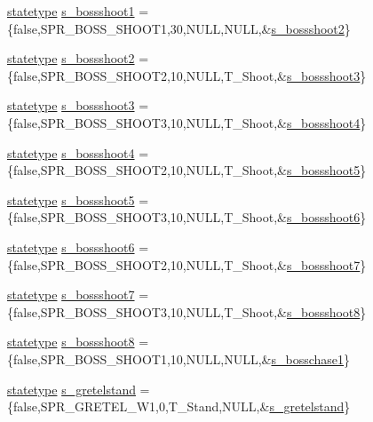 \begin{DoxyCompactItemize}
\hyperlink{structstatestruct}{statetype} \hyperlink{WL__ACT2_8C_a70bba3f03ab51f1e1837358a62d0dd4d}{s\_\-bossshoot1} = \{false,SPR\_\-BOSS\_\-SHOOT1,30,NULL,NULL,\&\hyperlink{WL__ACT2_8C_aaa374c93372be8abb5ed60ea25234fab}{s\_\-bossshoot2}\}
\item 
\hyperlink{structstatestruct}{statetype} \hyperlink{WL__ACT2_8C_aaa374c93372be8abb5ed60ea25234fab}{s\_\-bossshoot2} = \{false,SPR\_\-BOSS\_\-SHOOT2,10,NULL,T\_\-Shoot,\&\hyperlink{WL__ACT2_8C_a24c6ef26a80f794833d9a763fef69be2}{s\_\-bossshoot3}\}
\item 
\hyperlink{structstatestruct}{statetype} \hyperlink{WL__ACT2_8C_a24c6ef26a80f794833d9a763fef69be2}{s\_\-bossshoot3} = \{false,SPR\_\-BOSS\_\-SHOOT3,10,NULL,T\_\-Shoot,\&\hyperlink{WL__ACT2_8C_a78df2716e7b9215264f283b578d5b884}{s\_\-bossshoot4}\}
\item 
\hyperlink{structstatestruct}{statetype} \hyperlink{WL__ACT2_8C_a78df2716e7b9215264f283b578d5b884}{s\_\-bossshoot4} = \{false,SPR\_\-BOSS\_\-SHOOT2,10,NULL,T\_\-Shoot,\&\hyperlink{WL__ACT2_8C_a4b2ddab891860569bbe1199ac3d82659}{s\_\-bossshoot5}\}
\item 
\hyperlink{structstatestruct}{statetype} \hyperlink{WL__ACT2_8C_a4b2ddab891860569bbe1199ac3d82659}{s\_\-bossshoot5} = \{false,SPR\_\-BOSS\_\-SHOOT3,10,NULL,T\_\-Shoot,\&\hyperlink{WL__ACT2_8C_abb4697fcd64af4469f1f3487fcb9aca6}{s\_\-bossshoot6}\}
\item 
\hyperlink{structstatestruct}{statetype} \hyperlink{WL__ACT2_8C_abb4697fcd64af4469f1f3487fcb9aca6}{s\_\-bossshoot6} = \{false,SPR\_\-BOSS\_\-SHOOT2,10,NULL,T\_\-Shoot,\&\hyperlink{WL__ACT2_8C_acd0e8c96f8356c2f331ff30a50aaa9e0}{s\_\-bossshoot7}\}
\item 
\hyperlink{structstatestruct}{statetype} \hyperlink{WL__ACT2_8C_acd0e8c96f8356c2f331ff30a50aaa9e0}{s\_\-bossshoot7} = \{false,SPR\_\-BOSS\_\-SHOOT3,10,NULL,T\_\-Shoot,\&\hyperlink{WL__ACT2_8C_af95404f552d02a0cdc0e3f8b8905018d}{s\_\-bossshoot8}\}
\item 
\hyperlink{structstatestruct}{statetype} \hyperlink{WL__ACT2_8C_af95404f552d02a0cdc0e3f8b8905018d}{s\_\-bossshoot8} = \{false,SPR\_\-BOSS\_\-SHOOT1,10,NULL,NULL,\&\hyperlink{WL__DEF_8H_a5135f3395ae6c6efc57951117610a58f}{s\_\-bosschase1}\}
\item 
\hyperlink{structstatestruct}{statetype} \hyperlink{WL__ACT2_8C_a6982d149c8cf782eb51cdbd3885455cc}{s\_\-gretelstand} = \{false,SPR\_\-GRETEL\_\-W1,0,T\_\-Stand,NULL,\&\hyperlink{WL__ACT2_8C_a6982d149c8cf782eb51cdbd3885455cc}{s\_\-gretelstand}\}
\item 

\end{DoxyCompactItemize}

